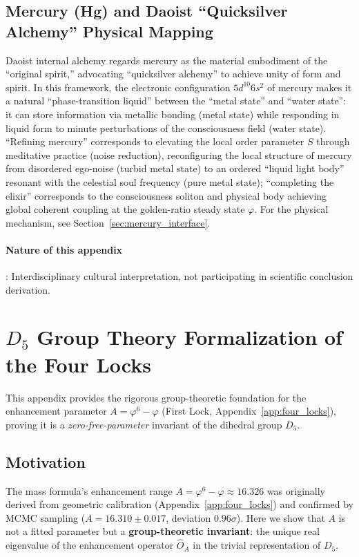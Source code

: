 \documentclass[12pt,a4paper,twocolumn]{article}
\renewcommand{\phi}{\varphi}
\begin{document}
\subsection{Mercury (Hg) and Daoist ``Quicksilver Alchemy'' Physical Mapping}
Daoist internal alchemy regards mercury as the material embodiment of the ``original spirit,'' advocating ``quicksilver alchemy'' to achieve unity of form and spirit. In this framework, the electronic configuration $5d^{10}6s^2$ of mercury makes it a natural ``phase-transition liquid'' between the ``metal state'' and ``water state'': it can store information via metallic bonding (metal state) while responding in liquid form to minute perturbations of the consciousness field (water state). ``Refining mercury'' corresponds to elevating the local order parameter $S$ through meditative practice (noise reduction), reconfiguring the local structure of mercury from disordered ego-noise (turbid metal state) to an ordered ``liquid light body'' resonant with the celestial soul frequency (pure metal state); ``completing the elixir'' corresponds to the consciousness soliton and physical body achieving global coherent coupling at the golden-ratio steady state $\phi$. For the physical mechanism, see Section~\ref{sec:mercury_interface}.

\paragraph{Nature of this appendix}: Interdisciplinary cultural interpretation, not participating in scientific conclusion derivation.


\section{$D_5$ Group Theory Formalization of the Four Locks}
\label{app:d5_group}

This appendix provides the rigorous group-theoretic foundation for the enhancement parameter $A = \phi^6 - \phi$ (First Lock, Appendix~\ref{app:four_locks}), proving it is a \emph{zero-free-parameter} invariant of the dihedral group $D_5$.

\subsection{Motivation}
The mass formula's enhancement range $A = \phi^6 - \phi \approx 16.326$ was originally derived from geometric calibration (Appendix~\ref{app:four_locks}) and confirmed by MCMC sampling ($A = 16.310 \pm 0.017$, deviation $0.96\sigma$). Here we show that $A$ is not a fitted parameter but a \textbf{group-theoretic invariant}: the unique real eigenvalue of the enhancement operator $\hat{O}_A$ in the trivial representation of $D_5$.
\end{document}
